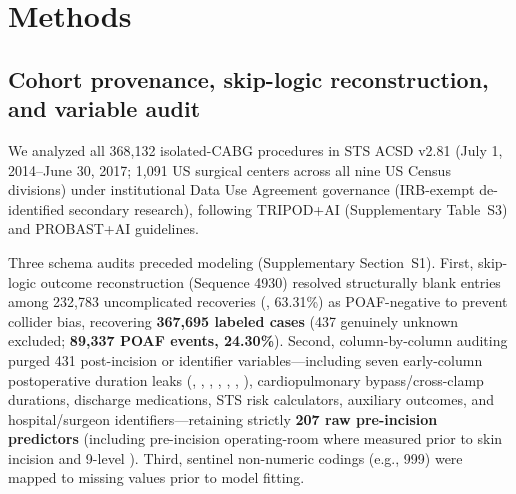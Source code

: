 \section{Methods}

\subsection{Cohort provenance, skip-logic reconstruction, and variable audit}
We analyzed all 368,132 isolated-CABG procedures in STS ACSD v2.81 (July 1, 2014--June 30, 2017; 1,091 US surgical centers across all nine US Census divisions)\cite{sts2014v281,shahian2018sts} under institutional Data Use Agreement governance (IRB-exempt de-identified secondary research), following TRIPOD+AI (Supplementary Table~S3) and PROBAST+AI guidelines.\cite{collins2024tripodai,moons2025probastai}

Three schema audits preceded modeling (Supplementary Section~S1). First, skip-logic outcome reconstruction (Sequence 4930) resolved structurally blank  entries among 232,783 uncomplicated recoveries (, 63.31\%) as POAF-negative to prevent collider bias,\cite{hernan2020causal} recovering \textbf{367,695 labeled cases} (437 genuinely unknown excluded; \textbf{89,337 POAF events, 24.30\%}). Second, column-by-column auditing purged 431 post-incision or identifier variables---including seven early-column postoperative duration leaks (, , , , , , ), cardiopulmonary bypass/cross-clamp durations, discharge medications, STS risk calculators, auxiliary outcomes, and hospital/surgeon identifiers---retaining strictly \textbf{207 raw pre-incision predictors} (including pre-incision operating-room  where measured prior to skin incision and 9-level ). Third, sentinel non-numeric codings (e.g., 999) were mapped to missing values prior to model fitting.

